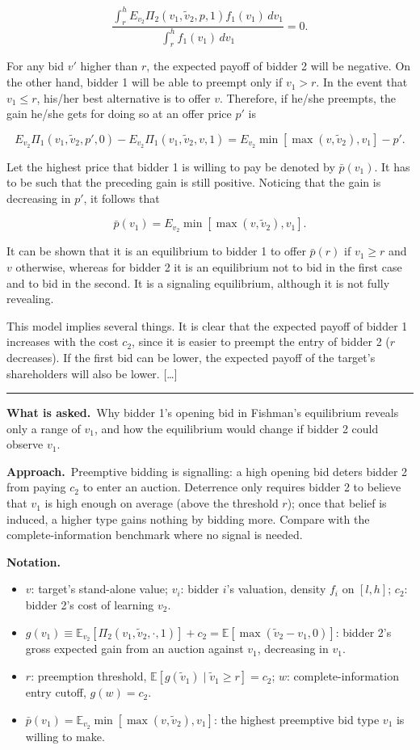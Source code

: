 \documentclass[11pt,a4paper]{article}
\newcommand{\notation}{\par\noindent\textbf{Notation.}}
\newcommand{\asked}{\par\medskip\noindent\textbf{What is asked.}~}
\newcommand{\approach}{\par\smallskip\noindent\textbf{Approach.}~}
\newcommand{\E}{\mathbb{E}}
\newcommand{\stmtend}{\par\endgroup\nopagebreak\noindent\rule{\linewidth}{0.4pt}\par\medskip}
\begin{document}
\[\frac{\int_r^h E_{v_2} \Pi_2(v_1, \tilde v_2, p, 1) f_1(v_1)\, dv_1}{\int_r^h f_1(v_1)\, dv_1} = 0.\]

For any bid \(v'\) higher than \(r\), the expected payoff of bidder 2 will be negative. On the other
hand, bidder 1 will be able to preempt only if \(v_1 > r\). In the event that \(v_1 \leq r\),
his/her best alternative is to offer \(v\). Therefore, if he/she preempts, the gain he/she gets for
doing so at an offer price \(p'\) is

\[E_{v_2}\Pi_1(v_1, \tilde v_2, p', 0) - E_{v_2}\Pi_1(v_1, \tilde v_2, v, 1) = E_{v_2} \min[\max(v, \tilde v_2), v_1] - p'.\]

Let the highest price that bidder 1 is willing to pay be denoted by \(\bar p(v_1)\). It has to be
such that the preceding gain is still positive. Noticing that the gain is decreasing in \(p'\), it
follows that

\[\bar p(v_1) = E_{v_2} \min[\max(v, \tilde v_2), v_1].\]

It can be shown that it is an equilibrium to bidder 1 to offer \(\bar p(r)\) if \(v_1 \geq r\) and
\(v\) otherwise, whereas for bidder 2 it is an equilibrium not to bid in the first case and to bid
in the second. It is a signaling equilibrium, although it is not fully revealing.

This model implies several things. It is clear that the expected payoff of bidder 1 increases with
the cost \(c_2\), since it is easier to preempt the entry of bidder 2 (\(r\) decreases). If the
first bid can be lower, the expected payoff of the target's shareholders will also be lower.
{[}\ldots{]}
\stmtend

\asked Why bidder 1's opening bid in Fishman's equilibrium reveals only a range of $v_1$, and how the
equilibrium would change if bidder 2 could observe $v_1$.

\approach Preemptive bidding is signalling: a high opening bid deters bidder 2 from paying $c_2$ to
enter an auction. Deterrence only requires bidder 2 to believe that $v_1$ is high enough on average
(above the threshold $r$); once that belief is induced, a higher type gains nothing by bidding more.
Compare with the complete-information benchmark where no signal is needed.

\notation
\begin{itemize}
  \item $v$: target's stand-alone value; $v_i$: bidder $i$'s valuation, density $f_i$ on $[l,h]$; $c_2$: bidder 2's cost of learning $v_2$.
  \item $g(v_1)\equiv\E_{v_2}[\Pi_2(v_1,\tilde v_2,\cdot,1)]+c_2=\E[\max(\tilde v_2-v_1,0)]$: bidder 2's gross expected gain from an auction against $v_1$, decreasing in $v_1$.
  \item $r$: preemption threshold, $\E[g(\tilde v_1)\mid \tilde v_1\ge r]=c_2$; $w$: complete-information entry cutoff, $g(w)=c_2$.
  \item $\bar p(v_1)=\E_{v_2}\min[\max(v,\tilde v_2),v_1]$: the highest preemptive bid type $v_1$ is willing to make.
\end{itemize}
\end{document}
